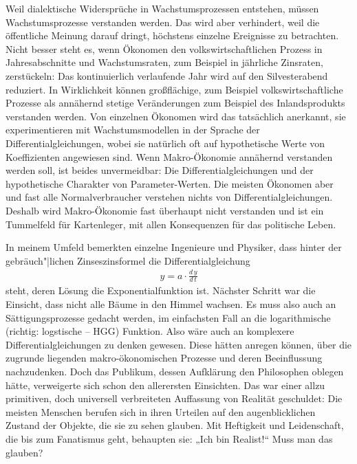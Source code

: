 \documentclass[11pt,a4paper]{article}
\begin{document}
Weil dialektische Widersprüche in Wachstumsprozessen entstehen, müssen
Wachstumsprozesse verstanden werden. Das wird aber verhindert, weil die
öffentliche Meinung darauf dringt, höchstens einzelne Ereignisse zu
betrachten.  Nicht besser steht es, wenn Ökonomen den volkswirtschaftlichen
Prozess in Jahresabschnitte und Wachstumsraten, zum Beispiel in jährliche
Zinsraten, zerstückeln: Das kontinuierlich verlaufende Jahr wird auf den
Silvesterabend reduziert. In Wirklichkeit können großflächige, zum Beispiel
volkswirtschaftliche Prozesse als annähernd stetige Veränderungen zum Beispiel
des Inlandsprodukts verstanden werden. Von einzelnen Ökonomen wird das
tatsächlich anerkannt, sie experimentieren mit Wachstumsmodellen in der
Sprache der Differentialgleichungen, wobei sie natürlich oft auf hypothetische
Werte von Koeffizienten angewiesen sind. Wenn Makro-Ökonomie annähernd
verstanden werden soll, ist beides unvermeidbar: Die Differentialgleichungen
und der hypothetische Charakter von Parameter-Werten. Die meisten Ökonomen
aber und fast alle Normalverbraucher verstehen nichts von
Differentialgleichungen.  Deshalb wird Makro-Ökonomie fast überhaupt nicht
verstanden und ist ein Tummelfeld für Kartenleger, mit allen Konsequenzen für
das politische Leben.

In meinem Umfeld bemerkten einzelne Ingenieure und Physiker, dass hinter der
gebräuch"|lichen Zinseszinsformel die Differentialgleichung
\begin{gather*}
  y = a\cdot \frac{d\,y}{d\,t}
\end{gather*}
steht, deren Lösung die Exponentialfunktion ist. Nächster Schritt war die
Einsicht, dass nicht alle Bäume in den Himmel wachsen. Es muss also auch an
Sättigungsprozesse gedacht werden, im einfachsten Fall an die logarithmische
(richtig: logstische -- HGG) Funktion. Also wäre auch an komplexere
Differentialgleichungen zu denken gewesen. Diese hätten anregen können, über
die zugrunde liegenden makro-ökonomischen Prozesse und deren Beeinflussung
nachzudenken. Doch das Publikum, dessen Aufklärung den Philosophen oblegen
hätte, verweigerte sich schon den allerersten Einsichten. Das war einer allzu
primitiven, doch universell verbreiteten Auffassung von Realität geschuldet:
Die meisten Menschen berufen sich in ihren Urteilen auf den augenblicklichen
Zustand der Objekte, die sie zu sehen glauben. Mit Heftigkeit und
Leidenschaft, die bis zum Fanatismus geht, behaupten sie: „Ich bin Realist!“
Muss man das glauben?
\end{document}
